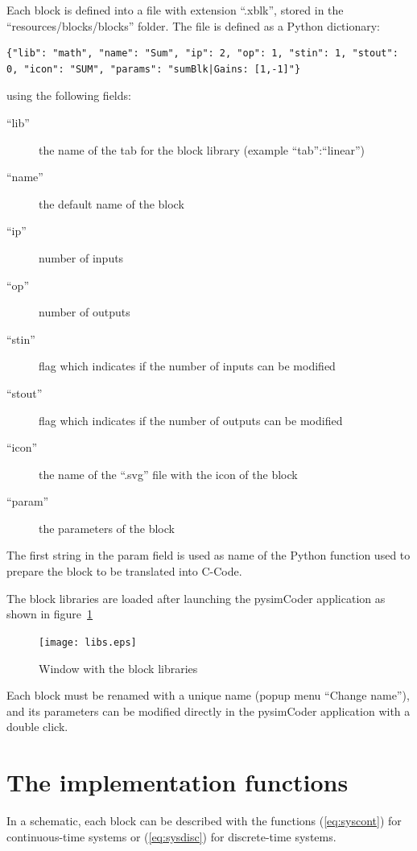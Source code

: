 Each block is defined into a file with extension ``.xblk'', stored in 
the ``resources/blocks/blocks'' folder.
The file is defined as a Python dictionary:

\scriptsize
\begin{verbatim}
{"lib": "math", "name": "Sum", "ip": 2, "op": 1, "stin": 1, "stout": 0, "icon": "SUM", "params": "sumBlk|Gains: [1,-1]"}
\end{verbatim}
\normalsize

using the following fields:

\begin{description}
\item[``lib''] the name of the tab for the block library (example 
``tab'':``linear'')
\item [``name''] the default name of the block
\item [``ip''] number of inputs
\item [``op''] number of outputs
\item [``stin''] flag which indicates if the number of inputs can be modified
\item [``stout''] flag which indicates if the number of outputs can be modified
\item [``icon'']the name of the ``.svg'' file with the icon of the block
\item [``param''] the parameters of the block
\end{description}

The first string in the param field is used as name of the Python function used 
to prepare the block to be translated into C-Code.

The block libraries are loaded after launching the pysimCoder application as shown 
in figure~\ref{Fig:app1}

 \begin{figure}[htbp]	%
 \centering
 \texttt{[image: libs.eps]}
 \caption{Window with the block libraries}
 \label{Fig:app1}
 \end{figure}

Each block must be renamed with a unique name (popup menu ``Change name''), and 
its parameters can be modified directly in the pysimCoder application with a double 
click.

\section{The implementation functions}

In a schematic, each block can be described with the functions 
(\ref{eq:syscont}) for continuous-time systems or (\ref{eq:sysdisc}) for 
discrete-time systems.

